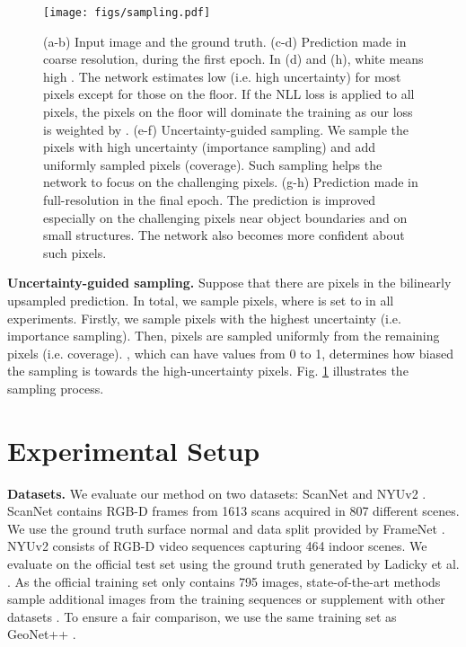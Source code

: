 \documentclass[10pt,twocolumn,letterpaper]{article}
\begin{document}
\begin{figure}[t]
\begin{center}
\texttt{[image: figs/sampling.pdf]}
\end{center}
\caption{(a-b) Input image and the ground truth. (c-d) Prediction made in coarse resolution, during the first epoch. In (d) and (h), white means high . The network estimates low  (i.e. high uncertainty) for most pixels except for those on the floor. If the NLL loss is applied to all pixels, the pixels on the floor will dominate the training as our loss is weighted by . (e-f) Uncertainty-guided sampling. We sample the pixels with high uncertainty (importance sampling) and add uniformly sampled pixels (coverage). Such sampling helps the network to focus on the challenging pixels. (g-h) Prediction made in full-resolution in the final epoch. The prediction is improved especially on the challenging pixels near object boundaries and on small structures. The network also becomes more confident about such pixels.}
\label{fig:sampling}
\end{figure}

\noindent
\textbf{Uncertainty-guided sampling.} Suppose that there are  pixels in the bilinearly upsampled prediction. In total, we sample  pixels, where  is set to  in all experiments. Firstly, we sample  pixels with the highest uncertainty (i.e. importance sampling). Then,  pixels are sampled uniformly from the remaining pixels (i.e. coverage). , which can have values from 0 to 1, determines how biased the sampling is towards the high-uncertainty pixels. Fig. \ref{fig:sampling} illustrates the sampling process. 

\section{Experimental Setup}

\noindent
\textbf{Datasets.} We evaluate our method on two datasets: ScanNet \cite{ScanNet} and NYUv2 \cite{NYUv2}. ScanNet contains RGB-D frames from 1613 scans acquired in 807 different scenes. We use the ground truth surface normal and data split provided by FrameNet \cite{SNfromRGB_19_FrameNet}. NYUv2 consists of RGB-D video sequences capturing 464 indoor scenes. We evaluate on the official test set using the ground truth generated by Ladicky et al. \cite{SNfromRGB_14_Ladicky}. As the official training set only contains 795 images, state-of-the-art methods sample additional images from the training sequences \cite{SNfromRGB_15_Deep3D,SNfromRGB_16_SkipNet,SNfromRGB_18_GeoNet,SNfromRGB_20_GeoNet++} or supplement with other datasets \cite{SNfromRGB_19_SR,SNfromRGB_19_FloorsAreFlat}. To ensure a fair comparison, we use the same training set as GeoNet++ \cite{SNfromRGB_20_GeoNet++}.
\end{document}
